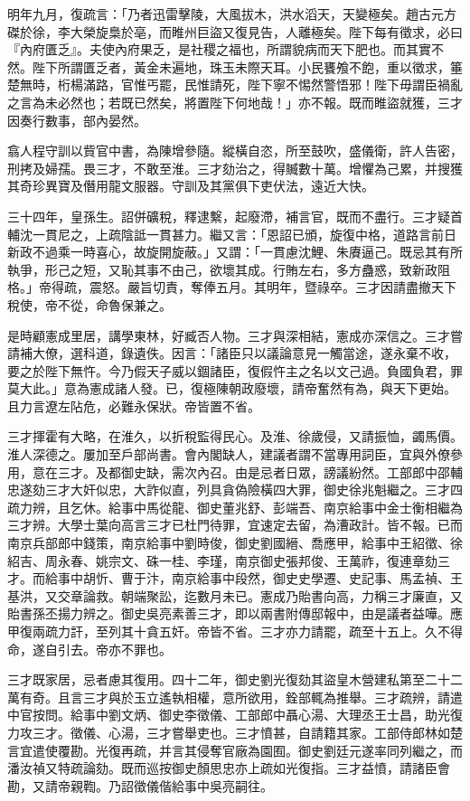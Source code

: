 \begin{pinyinscope}
明年九月，復疏言：「乃者迅雷擊陵，大風拔木，洪水滔天，天變極矣。趙古元方磔於徐，李大榮旋梟於亳，而睢州巨盜又復見告，人離極矣。陛下每有徵求，必曰『內府匱乏』。夫使內府果乏，是社稷之福也，所謂貌病而天下肥也。而其實不然。陛下所謂匱乏者，黃金未遍地，珠玉未際天耳。小民饔飧不飽，重以徵求，箠楚無時，桁楊滿路，官惟丐罷，民惟請死，陛下寧不惕然警悟邪！陛下毋謂臣禍亂之言為未必然也；若既已然矣，將置陛下何地哉！」亦不報。既而睢盜就獲，三才因奏行數事，部內晏然。

翕人程守訓以貲官中書，為陳增參隨。縱橫自恣，所至鼓吹，盛儀衛，許人告密，刑拷及婦孺。畏三才，不敢至淮。三才劾治之，得贓數十萬。增懼為己累，并搜獲其奇珍異寶及僭用龍文服器。守訓及其黨俱下吏伏法，遠近大快。

三十四年，皇孫生。詔併礦稅，釋逮繫，起廢滯，補言官，既而不盡行。三才疑首輔沈一貫尼之，上疏陰詆一貫甚力。繼又言：「恩詔已頒，旋復中格，道路言前日新政不過乘一時喜心，故旋開旋蔽。」又謂：「一貫慮沈鯉、朱賡逼己。既忌其有所執爭，形己之短，又恥其事不由己，欲壞其成。行賄左右，多方蠱惑，致新政阻格。」帝得疏，震怒。嚴旨切責，奪俸五月。其明年，暨祿卒。三才因請盡撤天下稅使，帝不從，命魯保兼之。

是時顧憲成里居，講學東林，好臧否人物。三才與深相結，憲成亦深信之。三才嘗請補大僚，選科道，錄遺佚。因言：「諸臣只以議論意見一觸當途，遂永棄不收，要之於陛下無忤。今乃假天子威以錮諸臣，復假忤主之名以文己過。負國負君，罪莫大此。」意為憲成諸人發。已，復極陳朝政廢壞，請帝奮然有為，與天下更始。且力言遼左阽危，必難永保狀。帝皆置不省。

三才揮霍有大略，在淮久，以折稅監得民心。及淮、徐歲侵，又請振恤，蠲馬價。淮人深德之。屢加至戶部尚書。會內閣缺人，建議者謂不當專用詞臣，宜與外僚參用，意在三才。及都御史缺，需次內召。由是忌者日眾，謗議紛然。工部郎中邵輔忠遂劾三才大奸似忠，大詐似直，列具貪偽險橫四大罪，御史徐兆魁繼之。三才四疏力辨，且乞休。給事中馬從龍、御史董兆舒、彭端吾、南京給事中金士衡相繼為三才辨。大學士葉向高言三才已杜門待罪，宜速定去留，為漕政計。皆不報。已而南京兵部郎中錢策，南京給事中劉時俊，御史劉國縉、喬應甲，給事中王紹徵、徐紹吉、周永春、姚宗文、硃一桂、李瑾，南京御史張邦俊、王萬祚，復連章劾三才。而給事中胡忻、曹于汴，南京給事中段然，御史史學遷、史記事、馬孟禎、王基洪，又交章論救。朝端聚訟，迄數月未已。憲成乃貽書向高，力稱三才廉直，又貽書孫丕揚力辨之。御史吳亮素善三才，即以兩書附傳邸報中，由是議者益嘩。應甲復兩疏力訐，至列其十貪五奸。帝皆不省。三才亦力請罷，疏至十五上。久不得命，遂自引去。帝亦不罪也。

三才既家居，忌者慮其復用。四十二年，御史劉光復劾其盜皇木營建私第至二十二萬有奇。且言三才與於玉立遙執相權，意所欲用，銓部輒為推舉。三才疏辨，請遣中官按問。給事中劉文炳、御史李徵儀、工部郎中聶心湯、大理丞王士昌，助光復力攻三才。徵儀、心湯，三才嘗舉吏也。三才憤甚，自請籍其家。工部侍郎林如楚言宜遣使覆勘。光復再疏，并言其侵奪官廠為園囿。御史劉廷元遂率同列繼之，而潘汝禎又特疏論劾。既而巡按御史顏思忠亦上疏如光復指。三才益憤，請諸臣會勘，又請帝親鞫。乃詔徵儀偕給事中吳亮嗣往。


\end{pinyinscope}
